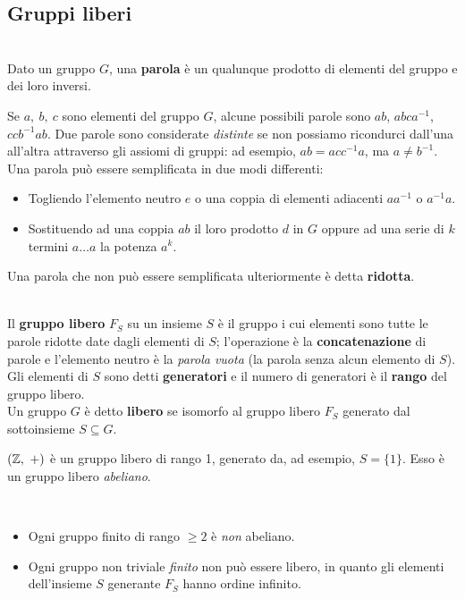 \subsection{Gruppi liberi}\label{gruppolibero}
\begin{define}[Parola.]~{}\\
	Dato un gruppo $G$, una \textbf{parola} è un qualunque prodotto di elementi del gruppo e dei loro inversi.
\end{define}
Se $a,\ b,\ c$ sono elementi del gruppo $G$, alcune possibili parole sono $ab$, $abca^{-1}$, $ccb^{-1}ab$.  Due parole sono considerate \textit{distinte} se non possiamo ricondurci dall'una all'altra attraverso gli assiomi di gruppi: ad esempio, $ab=acc^{-1}a$, ma $a\neq b^{-1}$. Una parola può essere semplificata in due modi differenti:
\begin{itemize}
	\item Togliendo l'elemento neutro $e$ o una coppia di elementi adiacenti $aa^{-1}$ o $a^{-1}a$.
	\item Sostituendo ad una coppia $ab$ il loro prodotto $d$ in $G$ oppure ad una serie di $k$ termini $a\ldots a$ la potenza $a^k$.
\end{itemize}
Una parola che non può essere semplificata ulteriormente è detta \textbf{ridotta}.
\begin{define}~{}\\
Il \textbf{gruppo libero} $F_S$ su un insieme $S$ è il gruppo i cui elementi sono tutte le parole ridotte date dagli elementi di $S$; l'operazione è la \textbf{concatenazione} di parole e l'elemento neutro è la \textit{parola vuota} (la parola senza alcun elemento di $S$).\\
Gli elementi di $S$ sono detti \textbf{generatori} e il numero di generatori è il \textbf{rango} del gruppo libero.\\
Un gruppo $G$ è detto \textbf{libero} se isomorfo al gruppo libero $F_S$ generato dal sottoinsieme $S\subseteq G$.
\end{define}
\begin{example}
	$\left(\mathbb{Z},\ +\right)$ è un gruppo libero di rango 1, generato da, ad esempio, $S=\{1\}$. Esso è un gruppo libero \textit{abeliano}.
\end{example}
\begin{observes}~{}
	\begin{itemize}
		\item Ogni gruppo finito di rango $\geq 2$ è \textit{non} abeliano.
		\item Ogni gruppo non triviale \textit{finito} non può essere libero, in quanto gli elementi dell'insieme $S$ generante $F_S$ hanno ordine infinito. 
	\end{itemize}
\vspace{-3mm}
\end{observes}
